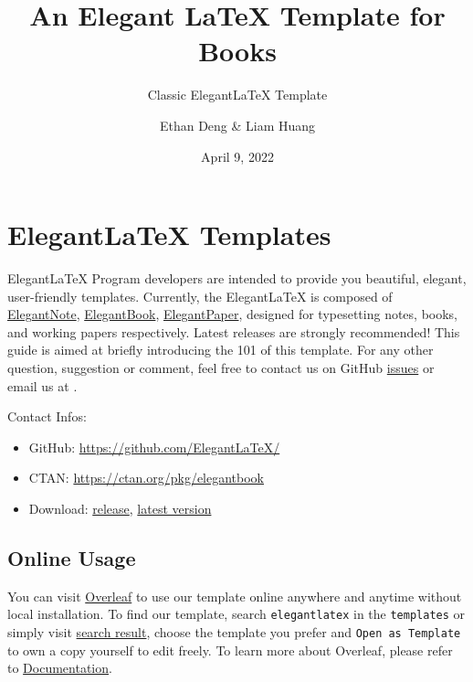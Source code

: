 \documentclass[11pt]{elegantbook}
\title{An Elegant \LaTeX{} Template for Books}
\subtitle{Classic Elegant\LaTeX{} Template}
\author{Ethan Deng \& Liam Huang}
\institute{Elegant\LaTeX{} Program}
\date{April 9, 2022}
\begin{document}
\maketitle

\frontmatter
\tableofcontents

\mainmatter

\chapter{Elegant\LaTeX{} Templates}
Elegant\LaTeX{} Program developers are intended to provide you beautiful, elegant, user-friendly templates. Currently, the Elegant\LaTeX{} is composed of \href{https://github.com/ElegantLaTeX/ElegantNote}{ElegantNote}, \href{https://github.com/ElegantLaTeX/ElegantBook}{ElegantBook}, \href{https://github.com/ElegantLaTeX/ElegantPaper}{ElegantPaper}, designed for typesetting notes, books, and working papers respectively. Latest releases are strongly recommended! This guide is aimed at briefly introducing the 101 of this template. For any other question, suggestion or comment, feel free to contact us on GitHub \href{https://github.com/ElegantLaTeX/ElegantBook/issues}{issues} or email us at .

Contact Infos:
\begin{itemize}
  \item GitHub: \href{https://github.com/ElegantLaTeX/}{https://github.com/ElegantLaTeX/}
  \item CTAN: \href{https://ctan.org/pkg/elegantbook}{https://ctan.org/pkg/elegantbook}
  \item Download: \href{https://github.com/ElegantLaTeX/ElegantBook/releases}{release}, \href{https://github.com/ElegantLaTeX/ElegantBook/archive/master.zip}{latest version}
\end{itemize}


\section{Online Usage}
You can visit \href{https://www.overleaf.com/}{Overleaf} to use our template online anywhere and anytime without local installation. To find our template, search \lstinline{elegantlatex} in the \lstinline{templates} or simply visit \href{https://www.overleaf.com/latex/templates?addsearch=elegantlatex}{search result}, choose the template you prefer and \lstinline{Open as Template} to own a copy yourself to edit freely. To learn more about Overleaf, please refer to \href{https://www.overleaf.com/learn}{Documentation}.
\end{document}
